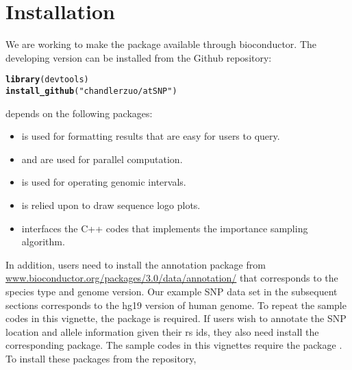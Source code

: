 \documentclass[a4paper,10pt]{article}\usepackage[]{graphicx}\usepackage[]{color}
\makeatletter
\newcommand{\hlstr}[1]{\textcolor[rgb]{0.192,0.494,0.8}{#1}}%
\newcommand{\hlstd}[1]{\textcolor[rgb]{0.345,0.345,0.345}{#1}}%
\newcommand{\hlkwd}[1]{\textcolor[rgb]{0.737,0.353,0.396}{\textbf{#1}}}%
\newenvironment{kframe}{%
 \def\at@end@of@kframe{}%
 \ifinner\ifhmode%
  \def\at@end@of@kframe{\end{minipage}}%
  \begin{minipage}{\columnwidth}%
 \fi\fi%
 \def\FrameCommand##1{\hskip\@totalleftmargin \hskip-\fboxsep
 \colorbox{shadecolor}{##1}\hskip-\fboxsep
     \hskip-\linewidth \hskip-\@totalleftmargin \hskip\columnwidth}%
 \MakeFramed {\advance\hsize-\width
   \@totalleftmargin\z@ \linewidth\hsize
   \@setminipage}}%
 {\par\unskip\endMakeFramed%
 \at@end@of@kframe}
\newenvironment{knitrout}{}{} %
\makeatother
\begin{document}
\section{Installation}

We are working to make the package available through bioconductor. The developing version can be installed from the Github repository:

\begin{knitrout}
\color{fgcolor}\begin{kframe}
\begin{alltt}
\hlkwd{library}\hlstd{(devtools)}
\hlkwd{install_github}\hlstd{(}\hlstr{"chandlerzuo/atSNP"}\hlstd{)}
\end{alltt}
\end{kframe}
\end{knitrout}

 depends on the following \R{} packages:

\begin{itemize}
\item {} is used for formatting results that are easy for users to query.
\item {} and  are used for parallel computation.
\item {} is used for operating genomic intervals.
\item {} is relied upon to draw sequence logo plots.
\item {} interfaces the C++ codes that implements the importance sampling algorithm.
\end{itemize}
  
In addition, users need to install the annotation package  from \url{www.bioconductor.org/packages/3.0/data/annotation/} that corresponds to the species type and genome version. Our example SNP data set in the subsequent sections corresponds to the hg19 version of human genome. To repeat the sample codes in this vignette, the  package is required. If users wish to annotate the SNP location and allele information given their rs ids, they also need install the corresponding  package. The sample codes in this vignettes require the package . To install these packages from the \Bioconductor{} repository,
\end{document}
